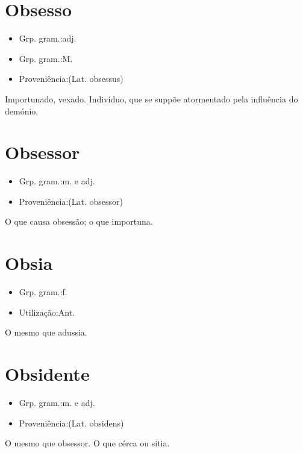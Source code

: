 \section{Obsesso}
\begin{itemize}
\item {Grp. gram.:adj.}
\end{itemize}
\begin{itemize}
\item {Grp. gram.:M.}
\end{itemize}
\begin{itemize}
\item {Proveniência:(Lat. \textunderscore obsessus\textunderscore )}
\end{itemize}
Importunado, vexado.
Indivíduo, que se suppõe atormentado pela influência do demónio.
\section{Obsessor}
\begin{itemize}
\item {Grp. gram.:m.  e  adj.}
\end{itemize}
\begin{itemize}
\item {Proveniência:(Lat. \textunderscore obsessor\textunderscore )}
\end{itemize}
O que causa obsessão; o que importuna.
\section{Obsia}
\begin{itemize}
\item {Grp. gram.:f.}
\end{itemize}
\begin{itemize}
\item {Utilização:Ant.}
\end{itemize}
O mesmo que \textunderscore adussia\textunderscore .
\section{Obsidente}
\begin{itemize}
\item {Grp. gram.:m.  e  adj.}
\end{itemize}
\begin{itemize}
\item {Proveniência:(Lat. \textunderscore obsidens\textunderscore )}
\end{itemize}
O mesmo que \textunderscore obsessor\textunderscore .
O que cérca ou sitia.
